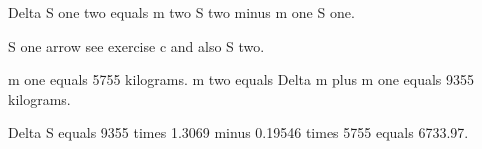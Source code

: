 Delta S one two equals m two S two minus m one S one.  

S one arrow see exercise c and also S two.  

m one equals 5755 kilograms. m two equals Delta m plus m one equals 9355 kilograms.  

Delta S equals 9355 times 1.3069 minus 0.19546 times 5755 equals 6733.97.